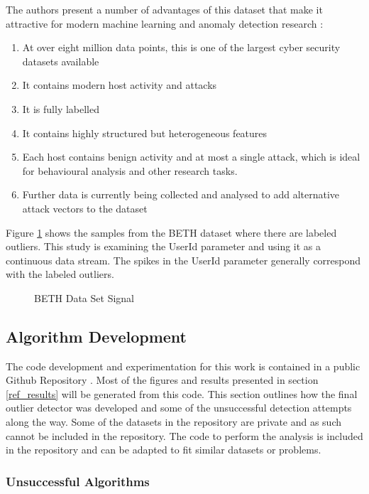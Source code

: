 The authors present a number of advantages of this dataset that make it attractive for modern machine learning and anomaly detection research \parencite{beth-dataset}:

\begin{enumerate}
    \item At over eight million data points, this is one of the largest cyber security datasets available
    \item It contains modern host activity and attacks
    \item It is fully labelled
    \item It contains highly structured but heterogeneous features 
    \item Each host contains benign activity and at most a single attack, which is ideal for behavioural analysis and other research tasks.
    \item Further data is currently being collected and analysed to add alternative attack vectors to the dataset
\end{enumerate}

Figure \ref{fig:beth_userid_all} shows the samples from the BETH dataset where there are labeled outliers. This study is examining the UserId parameter and using it as a continuous data stream. The spikes in the UserId parameter generally correspond with the labeled outliers.

\begin{figure}[H]
    
    \caption{BETH Data Set Signal}
    \label{fig:beth_userid_all}
\end{figure}


\subsection{Algorithm Development}

The code development and experimentation for this work is contained in a public Github Repository \parencite{BeattieGithub2022}. Most of the figures and results presented in section \ref{ref_results} will be generated from this code. This section outlines how the final outlier detector was developed and some of the unsuccessful detection attempts along the way. Some of the datasets in the repository are private and as such cannot be included in the repository. The code to perform the analysis is included in the repository and can be adapted to fit similar datasets or problems.

\subsubsection{Unsuccessful Algorithms}

